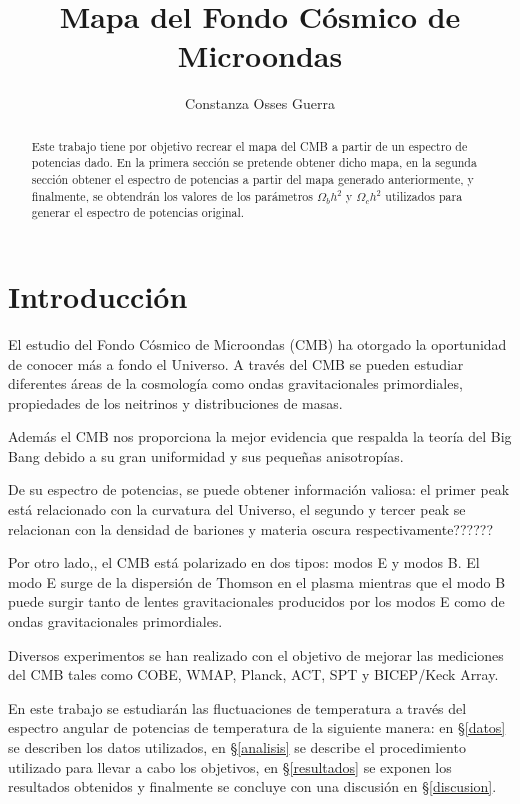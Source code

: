 \documentclass[twocolumn,letterpaper,spanish]{revtex4}
\numberwithin{equation}{section}
\begin{document}
\title{Mapa del Fondo Cósmico de Microondas}
\author{Constanza Osses Guerra}

\begin{abstract}
 Este trabajo tiene por objetivo recrear el mapa del CMB a partir de un espectro de potencias dado. En la primera sección se pretende obtener dicho mapa, en la segunda secci\'on obtener el espectro de potencias a partir del mapa generado anteriormente, y finalmente, se obtendr\'an los valores de los par\'ametros $\Omega_b h^2$ y $\Omega_c h^2$ utilizados para generar el espectro de potencias original.
\end{abstract}


\maketitle
\section{Introducción}

El estudio del Fondo C\'osmico de Microondas (CMB) \cite{cmb} ha otorgado la oportunidad de conocer m\'as a fondo el Universo. A trav\'es del CMB se pueden estudiar diferentes \'areas de la cosmolog\'ia como ondas gravitacionales primordiales, propiedades de los neitrinos y distribuciones de masas.

Adem\'as el CMB nos proporciona la mejor evidencia que respalda la teor\'ia del Big Bang debido a su gran uniformidad y sus peque\~nas anisotrop\'ias. 

De su espectro de potencias, se puede obtener informaci\'on valiosa: el primer peak est\'a relacionado con la curvatura del Universo, el segundo y tercer peak se relacionan con la densidad de bariones y materia oscura respectivamente??????

Por otro lado,, el CMB est\'a polarizado en dos tipos: modos E y modos B. El modo E surge de la dispersi\'on de Thomson en el plasma mientras que el modo B puede surgir tanto de lentes gravitacionales producidos por los modos E como de ondas gravitacionales primordiales.

Diversos experimentos se han realizado con el objetivo de mejorar las mediciones del CMB tales como COBE, WMAP, Planck, ACT, SPT y BICEP/Keck Array.

En este trabajo se estudiar\'an las fluctuaciones de temperatura a trav\'es del espectro angular de potencias de temperatura de la siguiente manera: en §\ref{datos} se describen los datos utilizados, en §\ref{analisis} se describe el procedimiento utilizado para llevar a cabo los objetivos, en §\ref{resultados} se exponen los resultados obtenidos y finalmente se concluye con una discusi\'on en §\ref{discusion}.
\end{document}
